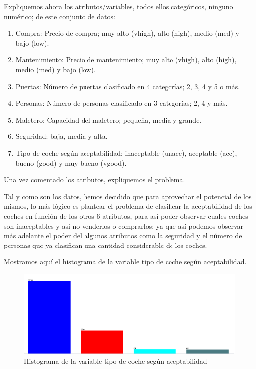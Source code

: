 \documentclass[a4paper, 11pt, twoside, openany, onecolumn, final]{memoir}
\begin{document}
		Expliquemos ahora los atributos/variables, todos ellos categóricos, ninguno numérico; de este conjunto de datos:
	
	\begin{enumerate}
\item Compra: Precio de compra; muy alto (vhigh), alto (high), medio (med) y bajo (low).
\item Mantenimiento: Precio de mantenimiento; muy alto (vhigh), alto (high), medio (med) y bajo (low).
\item Puertas: Número de puertas clasificado en 4 categorías; 2, 3, 4 y 5 o más.
\item Personas: Número de personas clasificado en 3 categorías; 2, 4 y más.
\item Maletero: Capacidad del maletero; pequeña, media y grande.
\item Seguridad: baja, media y alta. 
\item Tipo de coche según aceptabilidad: inaceptable (unacc), aceptable (acc), bueno (good) y muy bueno (vgood). 
\end{enumerate}
		
		Una vez comentado los atributos, expliquemos el problema. 

Tal y como son los datos, hemos decidido que para aprovechar el potencial de los mismos, lo más lógico es plantear el problema de clasificar la aceptabilidad de los coches en función de los otros 6 atributos, para así poder observar cuales coches son inaceptables y asi no venderlos o comprarlos; ya que así podemos observar más adelante el poder del algunos atributos como la seguridad y el número de personas que ya clasifican una cantidad considerable de los coches.

Mostramos aquí el histograma de la variable tipo de coche según aceptabilidad. 
	\begin{figure}
  		\centering
   		\includegraphics[width=1\textwidth]{Imagenes/HistogramaVarSalidaClasif}
  		\caption{Histograma de la variable tipo de coche según aceptabilidad}
  		\label{HistoVarSalidaClasi}
	\end{figure}
\end{document}
